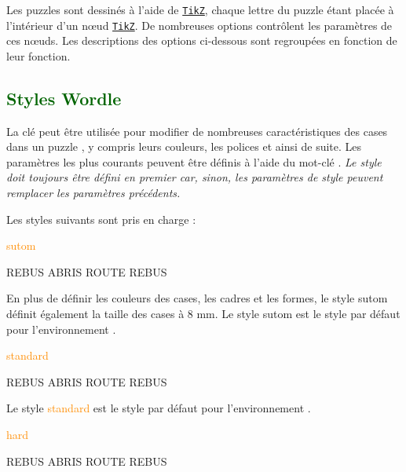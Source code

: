 \documentclass[svgnames]{report}
\newcommand\ctan[1]{\href{https://www.ctan.org/pkg/#1}{\texttt{#1}}}
\newcommand\Section[1]{\subsection{\textcolor{DarkGreen}{#1}}}
\begin{document}
  Les puzzles  sont dessinés à l'aide de \ctan{TikZ}, chaque lettre du puzzle étant placée à l'intérieur d'un nœud \ctan{TikZ}. De nombreuses options contrôlent les paramètres de ces nœuds. Les descriptions des options ci-dessous sont regroupées en fonction de leur fonction.

  \Section{Styles Wordle}

  La clé  peut être utilisée pour modifier de nombreuses caractéristiques des cases dans un puzzle , y compris leurs couleurs, les polices et ainsi de suite. Les paramètres les plus courants peuvent être définis à l'aide du mot-clé . \textit{Le style doit toujours être défini en premier car, sinon, les paramètres de style peuvent remplacer les paramètres précédents.}

  Les styles suivants sont pris en charge :

  \textcolor{DarkOrange}{sutom}

  \begin{example}
  \begin{wordle}[Style=sutom]{REBUS}
    ABRIS
    ROUTE
    REBUS
  \end{wordle}
  \end{example}

  En plus de définir les couleurs des cases, les cadres et les formes, le style \textsf{sutom} définit également la taille des cases à 8 mm. Le style \textsf{sutom} est le style par défaut pour l'environnement .

  \textcolor{DarkOrange}{standard}

  \begin{example}
  \begin{wordle}[Style=standard]{REBUS}
    ABRIS
    ROUTE
    REBUS
  \end{wordle}
  \end{example}

  Le style \textcolor{DarkOrange}{standard} est le style par défaut pour l'environnement .

  \textcolor{DarkOrange}{hard}

  \begin{example}
  \begin{wordle}[Style=hard]{REBUS}
    ABRIS
    ROUTE
    REBUS
  \end{wordle}
  \end{example}
\end{document}
